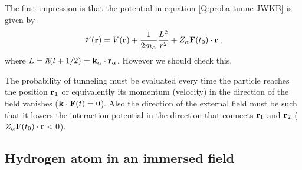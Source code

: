 The first impression is that the potential in equation
\ref{Q:proba-tunne-JWKB} is given by
%
\begin{equation}\label{Q:effec-poten-JWKB}
\mathcal{V}(\mathbf{r}) = V(\mathbf{r}) + \frac{1}{2 m_{\alpha}}
\frac{L^{2}}{r^{2}} + Z_{\alpha} \mathbf{F}(t_{0})  \cdot \mathbf{r} \, ,
\end{equation}
%
where $L=\hbar (l+1/2) = \mathbf{k}_{\alpha} \cdot \mathbf{r}_{\alpha}$.
However we should check this.

The probability of tunneling must be evaluated every time the particle
reaches the position $\mathbf{r}_{1}$ or equivalently its momentum
(velocity) in the direction of the field vanishes ($\mathbf{k} \cdot
\mathbf{F}(t) =0$). Also the direction of the external field must be such
that it lowers the interaction potential in the direction that connects
$\mathbf{r}_{1}$ and $\mathbf{r}_{2}$ ($Z_{\alpha} \mathbf{F}(t_{0})  \cdot \mathbf{r}
< 0$).

\subsection{Hydrogen atom in an immersed field}
\label{S:Hydro-atom-immer-field}

